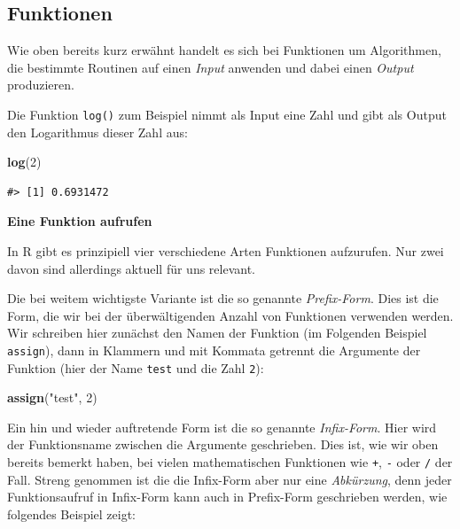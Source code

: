 \documentclass[]{book}
\newenvironment{Shaded}{\begin{snugshade}}{\end{snugshade}}
\newcommand{\KeywordTok}[1]{\textcolor[rgb]{0.13,0.29,0.53}{\textbf{#1}}}
\newcommand{\DecValTok}[1]{\textcolor[rgb]{0.00,0.00,0.81}{#1}}
\newcommand{\StringTok}[1]{\textcolor[rgb]{0.31,0.60,0.02}{#1}}
\newcommand{\NormalTok}[1]{#1}
\begin{document}
\subsection{Funktionen}\label{funktionen}

Wie oben bereits kurz erwähnt handelt es sich bei Funktionen um
Algorithmen, die bestimmte Routinen auf einen \emph{Input} anwenden und
dabei einen \emph{Output} produzieren.

Die Funktion \texttt{log()} zum Beispiel nimmt als Input eine Zahl und
gibt als Output den Logarithmus dieser Zahl aus:

\begin{Shaded}
\begin{Highlighting}[]
\KeywordTok{log}\NormalTok{(}\DecValTok{2}\NormalTok{)}
\end{Highlighting}
\end{Shaded}

\begin{verbatim}
#> [1] 0.6931472
\end{verbatim}

\textbf{Eine Funktion aufrufen}

In R gibt es prinzipiell vier verschiedene Arten Funktionen aufzurufen.
Nur zwei davon sind allerdings aktuell für uns relevant.

Die bei weitem wichtigste Variante ist die so genannte
\emph{Prefix-Form}. Dies ist die Form, die wir bei der überwältigenden
Anzahl von Funktionen verwenden werden. Wir schreiben hier zunächst den
Namen der Funktion (im Folgenden Beispiel \texttt{assign}), dann in
Klammern und mit Kommata getrennt die Argumente der Funktion (hier der
Name \texttt{test} und die Zahl \texttt{2}):

\begin{Shaded}
\begin{Highlighting}[]
\KeywordTok{assign}\NormalTok{(}\StringTok{"test"}\NormalTok{, }\DecValTok{2}\NormalTok{)}
\end{Highlighting}
\end{Shaded}

Ein hin und wieder auftretende Form ist die so genannte
\emph{Infix-Form}. Hier wird der Funktionsname zwischen die Argumente
geschrieben. Dies ist, wie wir oben bereits bemerkt haben, bei vielen
mathematischen Funktionen wie \texttt{+}, \texttt{-} oder \texttt{/} der
Fall. Streng genommen ist die die Infix-Form aber nur eine
\emph{Abkürzung}, denn jeder Funktionsaufruf in Infix-Form kann auch in
Prefix-Form geschrieben werden, wie folgendes Beispiel zeigt:
\end{document}
